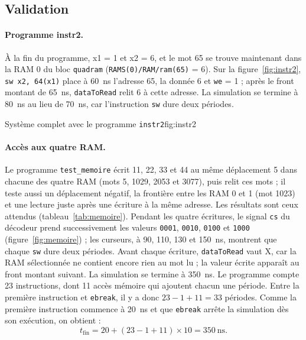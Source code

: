 \subsection{Validation}
\label{sec:validsysteme}

\paragraph{Programme instr2.}
À la fin du programme, x1 = 1 et x2 = 6, et le mot 65 se trouve maintenant dans la RAM 0 du bloc
\texttt{quadram} (\texttt{RAMS(0)/RAM/ram(65)} = 6). Sur la figure~\ref{fig:instr2},
\texttt{sw x2, 64(x1)} place à 60~ns l'adresse 65, la donnée 6 et \texttt{we} = 1 ; après le
front montant de 65~ns, \texttt{dataToRead} relit 6 à cette adresse. La simulation se
termine à 80~ns au lieu de 70~ns, car l'instruction \texttt{sw} dure deux périodes.

{Système complet avec le programme \texttt{instr2}}{fig:instr2}

\paragraph{Accès aux quatre RAM.}
Le programme \texttt{test\_memoire} écrit 11, 22, 33 et 44 au même déplacement 5 dans chacune des
quatre RAM (mots 5, 1029, 2053 et 3077), puis relit ces mots ; il teste aussi un déplacement
négatif, la frontière entre les RAM 0 et 1 (mot 1023) et une lecture juste après une écriture à
la même adresse. Les résultats sont ceux attendus (tableau~\ref{tab:memoire}). Pendant les quatre
écritures, le signal \texttt{cs} du décodeur prend successivement les valeurs \texttt{0001},
\texttt{0010}, \texttt{0100} et \texttt{1000} (figure~\ref{fig:memoire}) ; les curseurs, à 90,
110, 130 et 150~ns, montrent que chaque \texttt{sw} dure deux périodes. Avant chaque écriture,
\texttt{dataToRead} vaut X, car la RAM sélectionnée ne contient encore rien au mot lu ; la
valeur écrite apparaît au front montant suivant. La simulation se
termine à 350~ns. Le programme compte 23 instructions, dont 11 accès mémoire qui ajoutent
chacun une période. Entre la première instruction et \texttt{ebreak}, il y a donc
$23-1+11=33$ périodes. Comme la première instruction commence à 20~ns et que
\texttt{ebreak} arrête la simulation dès son exécution, on obtient :
\[
  t_{\mathrm{fin}} = 20 + (23-1+11)\times10 = 350~\mathrm{ns}.
\]

